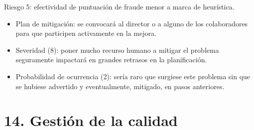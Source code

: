 \documentclass[
11pt, %
]{charter}
\begin{document}
Riesgo 5: efectividad de puntuación de fraude menor a marca de heurística.
\begin{itemize}
	\item Plan de mitigación: se convocará al director o a alguno de los colaboradores para que participen activamente en la mejora.
	\item Severidad (8): poner mucho recurso humano a mitigar el problema seguramente impactará en grandes retrasos en la planificación.
	\item Probabilidad de ocurrencia (2): sería raro que surgiese este problema sin que se hubiese advertido y eventualmente, mitigado, en pasos anteriores.
\end{itemize}




\section{14. Gestión de la calidad}
\label{sec:calidad}
\end{document}
